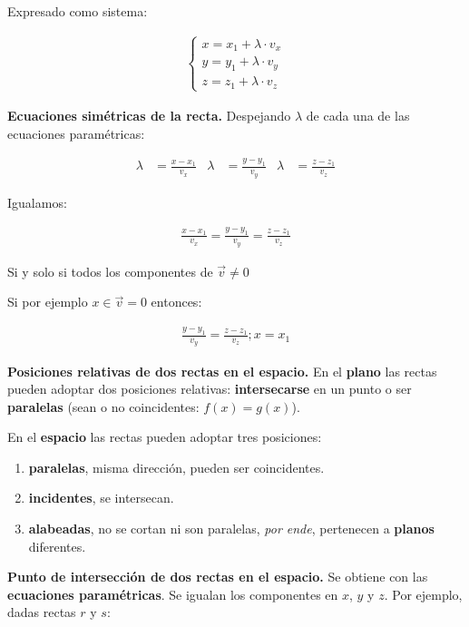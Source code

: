 \documentclass{article}
\begin{document}
Expresado como sistema:

\begin{align*}
    \begin{cases}
        x = x_1 + \lambda \cdot v_x \\
        y = y_1 + \lambda \cdot v_y \\
        z = z_1 + \lambda \cdot v_z
    \end{cases}
\end{align*}

\textbf{Ecuaciones simétricas de la recta.}
Despejando \(\lambda\) de cada una de las ecuaciones paramétricas:

\begin{align*}
    \lambda & = \frac{x - x_1}{v_x} & \lambda & = \frac{y - y_1}{v_y} & \lambda & = \frac{z - z_1}{v_z}
\end{align*}

Igualamos:

\begin{align*}
    \frac{x - x_1}{v_x} = \frac{y - y_1}{v_y} = \frac{z - z_1}{v_z}
\end{align*}

Si y solo si todos los componentes de \(\vec{v} \neq 0\)

Si por ejemplo \(x \in \vec{v} = 0\) entonces:

\begin{align*}
    \frac{y - y_1}{v_y} = \frac{z - z_1}{v_z}; x = x_1
\end{align*}

\textbf{Posiciones relativas de dos rectas en el espacio.}
En el \textbf{plano} las rectas pueden adoptar dos posiciones relativas:
\textbf{intersecarse} en un punto o ser \textbf{paralelas}
(sean o no coincidentes: \(f(x) = g(x)\)).

En el \textbf{espacio} las rectas pueden adoptar tres posiciones:

\begin{enumerate}
    \item \textbf{paralelas}, misma dirección, pueden ser coincidentes.
    \item \textbf{incidentes}, se intersecan.
    \item \textbf{alabeadas}, no se cortan ni son paralelas,
          \textit{por ende}, pertenecen a \textbf{planos} diferentes.
\end{enumerate}

\textbf{Punto de intersección de dos rectas en el espacio.}
Se obtiene con las \textbf{ecuaciones paramétricas}.
Se igualan los componentes en $x$, $y$ y $z$.
Por ejemplo, dadas rectas \(r\) y \(s\):
\end{document}
